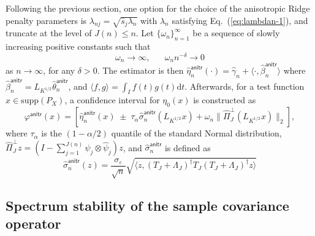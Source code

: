 \documentclass[11pt,a4paper]{article}
\renewcommand{\hat}{\widehat}
\theoremstyle{definition}
\theoremstyle{plain}
\theoremstyle{remark}
\newcommand{\supp}{\mathrm{supp}}
\newcommand{\ud}{\mathrm d}
\newcommand{\anitr}{\mathsf{anitr}}
\begin{document}
Following the previous section, one option for the choice of the anisotropic Ridge penalty parameters is $\lambda_{nj}=\sqrt{\hat s_j\lambda_n}$ with $\lambda_n$ satisfying Eq.~(\ref{eq:lambdan-1}),
and truncate at the level of $J(n)\leq n$.
Let $\{\omega_n\}_{n=1}^{\infty}$ be a sequence of slowly increasing positive constants such that
\begin{equation}
\omega_n\to\infty,\;\;\;\;\;\;\omega_n n^{-\delta}\to 0
\label{eq:omega}
\end{equation}
as $n\to\infty$, for any $\delta>0$.
The estimator is then $\hat\eta_n^\anitr(\cdot)=\hat\gamma_n + \langle\cdot,\hat\beta_n^\anitr\rangle$ where $\hat\beta_n^\anitr = L_{K^{1/2}}\hat\theta_n^\anitr$,
and $\langle f,g\rangle = \int_I f(t)g(t)\ud t$.
Afterwards, for a test function $x\in\supp(P_X)$, a confidence interval for $\eta_0(x)$ is constructed as
$$
\varphi^\anitr(x) = [\hat\eta_n^\anitr(x)\;\pm\; \tau_{\alpha}\hat\sigma_n^\anitr(L_{K^{1/2}}x) + \omega_n\|\hat\Pi_J^\perp (L_{K^{1/2}}x)\|_2],
$$
where $\tau_{\alpha}$ is the $(1-\alpha/2)$ quantile of the standard Normal distribution, $\hat\Pi_J^\perp z=(I-\sum_{j=1}^{J(n)}\hat\psi_j\otimes\hat\psi_j)z$, and $\hat\sigma_n^\anitr$ is defined as
$$
\hat\sigma_n^\anitr(z) = \frac{\sigma_\varepsilon}{\sqrt{n}}\sqrt{\langle z, (T_J+\Lambda_J)^\dagger T_J(T_J+\Lambda_J)^\dagger z\rangle}
$$


\subsection{Spectrum stability of the sample covariance operator}
\end{document}
